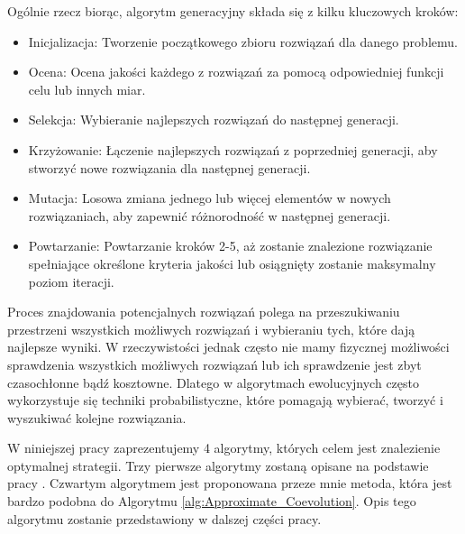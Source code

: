\documentclass[inzynierska]{pwr_wmat_praca_dyplomowa}
\theoremstyle{plain}
\numberwithin{theorem}{chapter}
\theoremstyle{definition}
\numberwithin{theorem}{chapter}
\begin{document}
	Ogólnie rzecz biorąc, algorytm generacyjny składa się z kilku kluczowych kroków:
	\begin{itemize}
		\item Inicjalizacja: Tworzenie początkowego zbioru rozwiązań dla danego problemu.
		\item Ocena: Ocena jakości każdego z rozwiązań za pomocą odpowiedniej funkcji celu lub innych miar.
		\item Selekcja: Wybieranie najlepszych rozwiązań do następnej generacji.
		\item Krzyżowanie: Łączenie najlepszych rozwiązań z poprzedniej generacji, aby stworzyć nowe rozwiązania dla następnej generacji.
		\item Mutacja: Losowa zmiana jednego lub więcej elementów w nowych rozwiązaniach, aby zapewnić różnorodność w następnej generacji.
		\item Powtarzanie: Powtarzanie kroków 2-5, aż zostanie znalezione rozwiązanie spełniające określone kryteria jakości lub osiągnięty zostanie maksymalny poziom iteracji.
	\end{itemize}	
	Proces znajdowania potencjalnych rozwiązań polega na przeszukiwaniu przestrzeni wszystkich możliwych rozwiązań i wybieraniu tych, które dają najlepsze wyniki. W rzeczywistości jednak często nie mamy fizycznej możliwości sprawdzenia wszystkich możliwych rozwiązań lub ich sprawdzenie jest zbyt czasochłonne bądź kosztowne. Dlatego w algorytmach ewolucyjnych często wykorzystuje się techniki probabilistyczne, które pomagają wybierać, tworzyć i wyszukiwać kolejne rozwiązania.
	
	W niniejszej pracy zaprezentujemy 4 algorytmy, których celem jest znalezienie optymalnej strategii. Trzy pierwsze algorytmy zostaną opisane na podstawie pracy \cite{cauwet2018surprising}. Czwartym algorytmem jest proponowana przeze mnie metoda, która jest bardzo podobna do Algorytmu \ref{alg:Approximate_Coevolution}. Opis tego algorytmu zostanie przedstawiony w dalszej części pracy.
\end{document}
